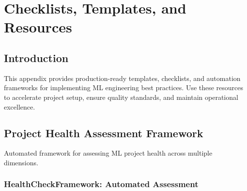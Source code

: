 \chapter{Checklists, Templates, and Resources}

\section{Introduction}

This appendix provides production-ready templates, checklists, and automation frameworks for implementing ML engineering best practices. Use these resources to accelerate project setup, ensure quality standards, and maintain operational excellence.

\section{Project Health Assessment Framework}

Automated framework for assessing ML project health across multiple dimensions.

\subsection{HealthCheckFramework: Automated Assessment}

